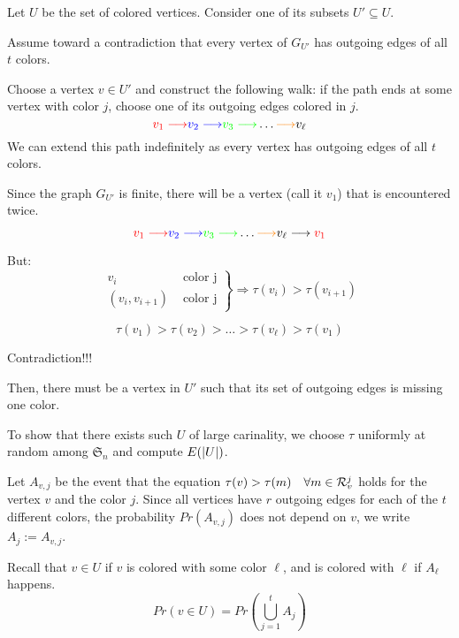 \begin{frame}
    Let $U$ be the set of colored vertices. Consider one of its subsets $U' \subseteq U$.
    
    Assume toward a contradiction that every vertex of $G_{U'}$ has outgoing edges of all $t$ colors.
    
    Choose a vertex $v \in U'$ and construct the following walk: if the path ends at some vertex with color $j$, choose one of its outgoing edges colored in $j$.
    $$\textcolor{red}{v_1 \longrightarrow } \textcolor{blue}{v_2 \longrightarrow} \textcolor{green}{v_3 \longrightarrow} \dots \textcolor{orange}{\longrightarrow} v_\ell$$
    We can extend this path indefinitely as every vertex has outgoing edges of all $t$ colors.
\end{frame}

\begin{frame}
    Since the graph $G_{U'}$ is finite, there will be a vertex (call it $v_1$) that is encountered twice.

    $$\textcolor{red}{v_1 \longrightarrow } \textcolor{blue}{v_2 \longrightarrow} \textcolor{green}{v_3 \longrightarrow} \dots \textcolor{orange}{\longrightarrow} v_\ell \longrightarrow \textcolor{red}{v_1}$$
    
    But:
        $$
            \left .
                \begin{matrix}
                    v_i & \mbox{ color j} \\
                    (v_i, v_{i+1}) & \mbox{ color j}
                \end{matrix}
            \right \}
            \Longrightarrow \tau (v_i) > \tau (v_{i+1})
        $$
        
        $$
            \tau (v_1) > \tau (v_2) > \dots > \tau (v_\ell) > \tau (v_1) 
        $$
        
        Contradiction!!!
        
        Then, there must be a vertex in $U'$ such that its set of outgoing edges is missing one color.
        
\end{frame}

\begin{frame}
    To show that there exists such $U$ of large carinality, we choose $\tau$ uniformly at random among $\mathfrak{S}_n$ and compute $E(\left\vert {U} \right\vert)$.
    
    Let $A_{v,j}$ be the event that the equation $\tau(v) > \tau(m) \quad \forall m \in \mathcal{R}_v^j$ holds for the vertex $v$ and the color $j$.
    Since all vertices have $r$ outgoing edges for each of the $t$ different colors, the probability $Pr(A_{v,j})$ does not depend on $v$, we write $A_{j} :=  A_{v,j}$.
    
    Recall that $v \in U$ if $v$ is colored with some color $\ell$, and is colored with $\ell$ if $A_{\ell}$ happens.
    $$Pr(v \in U) = Pr(\bigcup_{j=1}^{t} A_j)$$
\end{frame}

